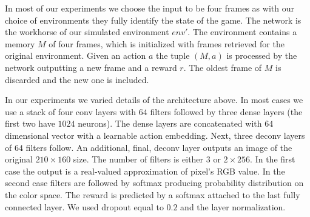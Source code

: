 	In most of our experiments we choose the input to be four frames as with our choice of environments they fully identify the state of the game. The network is the workhorse of our simulated environment $env'$. The environment contains a memory $M$ of four frames, which is initialized with frames retrieved for the original environment. Given an action $a$ the tuple $(M,a)$ is processed by the network outputting a new frame and a reward $r$. The oldest frame of $M$ is discarded and the new one is included. 


In our experiments we varied details of the architecture above. In most cases we use a stack of four conv layers with $64$ filters followed by three dense layers (the first two have $1024$ neurons). The dense layers are concatenated with $64$ dimensional vector with a learnable action embedding. Next, three deconv layers of $64$ filters follow. An additional, final, deconv layer outputs an image of the original $210\times 160$ size. The number of filters is either $3$ or $2\times 256$. In the first case the output is a real-valued approximation of pixel's RGB value. In the second case filters are followed by softmax producing probability distribution on the color space. The reward is predicted by a softmax attached to the last fully connected layer. 
We used dropout equal to $0.2$ and the layer normalization. 


